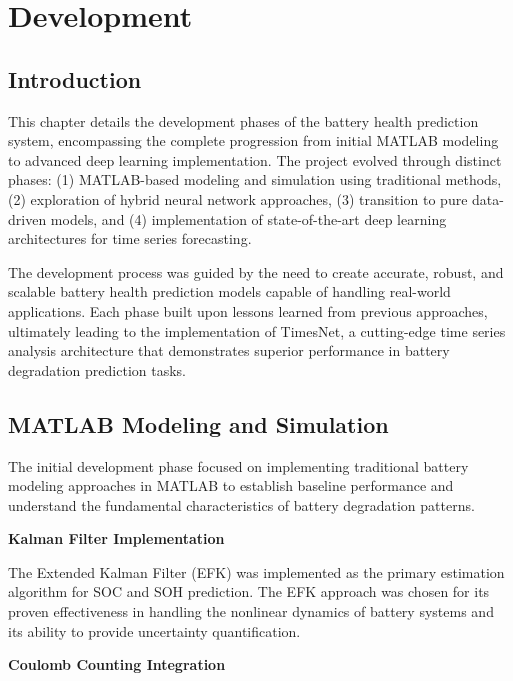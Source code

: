 \chapter{Development}
\label{ch:Development}

\section{Introduction}

This chapter details the development phases of the battery health prediction system, encompassing the complete progression from initial MATLAB modeling to advanced deep learning implementation. The project evolved through distinct phases: (1) MATLAB-based modeling and simulation using traditional methods, (2) exploration of hybrid neural network approaches, (3) transition to pure data-driven models, and (4) implementation of state-of-the-art deep learning architectures for time series forecasting.

The development process was guided by the need to create accurate, robust, and scalable battery health prediction models capable of handling real-world applications. Each phase built upon lessons learned from previous approaches, ultimately leading to the implementation of TimesNet, a cutting-edge time series analysis architecture that demonstrates superior performance in battery degradation prediction tasks.

\section{MATLAB Modeling and Simulation}

The initial development phase focused on implementing traditional battery modeling approaches in MATLAB to establish baseline performance and understand the fundamental characteristics of battery degradation patterns.

\textbf{Kalman Filter Implementation}

The Extended Kalman Filter (EFK) was implemented as the primary estimation algorithm for SOC and SOH prediction. The EFK approach was chosen for its proven effectiveness in handling the nonlinear dynamics of battery systems and its ability to provide uncertainty quantification.

\textbf{Coulomb Counting Integration}

